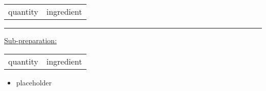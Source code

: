\Title{}{}%
\CookingTime{}
\PrepTime{}
\CookingTempe{}
\TypeCooking{}
\NbPerson{}

\begin{ingredient}
\begin{tabularx}{\textwidth} { 
  >{\raggedright\arraybackslash}X 
  >{\raggedright\arraybackslash}X}
 quantity & ingredient\\
\end{tabularx}
\rule{\textwidth}{1pt}
\vspace{0.25cm}
\underline{Sub-preparation:}
\begin{tabularx}{0.8\textwidth} { 
  >{\raggedright\arraybackslash}X 
  >{\raggedright\arraybackslash}X}
  quantity & ingredient\\
 \end{tabularx}

\end{ingredient} %
\begin{recipe}
\end{recipe}

\begin{notes}
\begin{itemize}
    \item placeholder
\end{itemize}
\end{notes}	